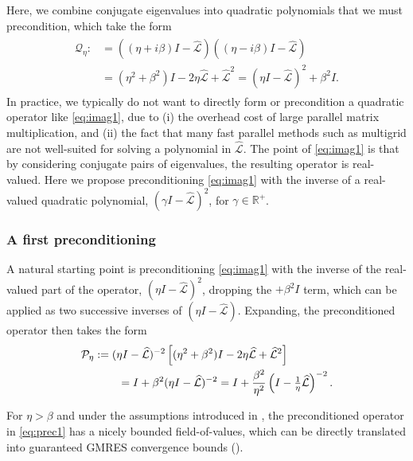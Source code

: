 \documentclass[review]{siamart}
\begin{document}
Here, we combine conjugate eigenvalues into quadratic polynomials
that we must precondition, which take the form
%
\begin{align}\label{eq:imag1}
\begin{split}
\mathcal{Q}_\eta :&= ((\eta + i\beta)I - \widehat{\mathcal{L}})((\eta - i\beta)I - \widehat{\mathcal{L}}) \\
& = (\eta^2+\beta^2)I - 2\eta \widehat{\mathcal{L}} + \widehat{\mathcal{L}}^2
= (\eta I - \widehat{\mathcal{L}})^2 + \beta^2I.
\end{split}
\end{align}
%
In practice, we typically do not want to directly form or precondition a quadratic
operator like \eqref{eq:imag1}, due to (i) the overhead cost of large parallel matrix
multiplication, and (ii) the fact that many fast parallel methods such as multigrid are not well-suited for solving a polynomial in $\widehat{\mathcal{L}}$. The point of \eqref{eq:imag1}
is that by considering conjugate pairs of eigenvalues, the resulting operator is real-valued.
Here we propose preconditioning \eqref{eq:imag1} with the inverse of a
real-valued quadratic polynomial, $(\gamma I - \widehat{\mathcal{L}})^2$, for
$\gamma \in\mathbb{R}^+$.

\subsubsection{A first preconditioning}\label{sec:solve:prec:eta}

A natural starting point is preconditioning \eqref{eq:imag1} with the inverse of
the real-valued part of the operator, $(\eta I - \widehat{\mathcal{L}})^2$,
dropping the $+ \beta^2 I$ term, which can be applied as two successive inverses
of $(\eta I - \widehat{\mathcal{L}})$. Expanding, the preconditioned operator
then takes the form
%
\begin{align}\nonumber
\mathcal{P}_\eta & := (\eta I - \widehat{\mathcal{L}})^{-2}\left[(\eta^2+\beta^2)I - 2\eta \widehat{\mathcal{L}} + \widehat{\mathcal{L}}^2\right] \\
&\hspace{5ex} = I + \beta^2(\eta I - \widehat{\mathcal{L}})^{-2}
= I + \frac{\beta^2}{\eta^2}\left(I - \tfrac{1}{\eta}\widehat{\mathcal{L}}\right)^{-2}.\label{eq:prec1}
\end{align}
%

For $\eta > \beta$ and under the assumptions introduced in ,
the preconditioned operator in \eqref{eq:prec1} has a nicely bounded field-of-values,
which can be directly translated into guaranteed GMRES convergence bounds
().
\end{document}
